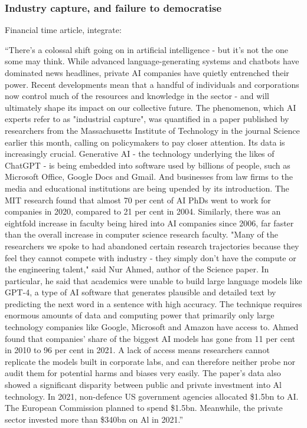 \subsubsection{Industry capture, and failure to democratise}
Financial time article, integrate:
\begin{tcolorbox}[enhanced, frame style={fill=lightgray}, interior style={fill=lightgray}]``There's a colossal shift going on in artificial intelligence - but it's not the one some may think. While advanced language-generating systems and chatbots have dominated news headlines, private AI companies have quietly entrenched their power. Recent developments mean that a handful of individuals and corporations now control much of the resources and knowledge in the sector - and will ultimately shape its impact on our collective future. The phenomenon, which AI experts refer to as "industrial capture", was quantified in a paper published by researchers from the Massachusetts Institute of Technology in the journal Science earlier this month, calling on policymakers to pay closer attention. Its data is increasingly crucial. Generative AI - the technology underlying the likes of ChatGPT - is being embedded into software used by billions of people, such as Microsoft Office, Google Docs and Gmail. And businesses from law firms to the media and educational institutions are being upended by its introduction.
The MIT research found that almost 70 per cent of AI PhDs went to work for companies in 2020, compared to 21 per cent in 2004. Similarly, there was an eightfold increase in faculty being hired into AI companies since 2006, far faster than the overall increase in computer science research faculty. "Many of the researchers we spoke to had abandoned certain research trajectories because they feel they cannot compete with industry - they simply don't have the compute or the engineering talent," said Nur Ahmed, author of the Science paper. In particular, he said that academics were unable to build large language models like GPT-4, a type of AI software that generates plausible and detailed text by predicting the next word in a sentence with high accuracy. The technique requires enormous amounts of data and computing power that primarily only large technology companies like Google, Microsoft and Amazon have access to. Ahmed found that companies' share of the biggest AI models has gone from 11 per cent in 2010 to 96 per cent in 2021. A lack of access means researchers cannot replicate the models built in corporate labs, and can therefore neither probe nor audit them for potential harms and biases very easily. The paper's data also showed a significant disparity between public and private investment into Al technology. In 2021, non-defence US government agencies allocated \$1.5bn to AI. The European Commission planned to spend \$1.5bn. Meanwhile, the private sector invested more than \$340bn on Al in 2021.''
\end{tcolorbox}

